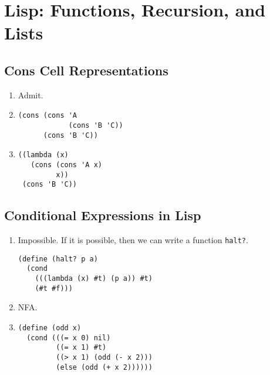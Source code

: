 \chapter{Lisp: Functions, Recursion, and Lists}


\section{Cons Cell Representations}
\begin{enumerate}
  \item
    Admit.

  \item
    \begin{verbatim}
(cons (cons 'A
            (cons 'B 'C))
      (cons 'B 'C))
    \end{verbatim}

  \item
    \begin{verbatim}
((lambda (x)
   (cons (cons 'A x)
         x))
 (cons 'B 'C))
    \end{verbatim}
\end{enumerate}


\section{Conditional Expressions in Lisp}
\begin{enumerate}
  \item
    Impossible. If it is possible, then we can write a function \texttt{halt?}.
    \begin{verbatim}
(define (halt? p a)
  (cond
    (((lambda (x) #t) (p a)) #t)
    (#t #f)))
    \end{verbatim}

  \item
    NFA.

  \item
    \begin{verbatim}
(define (odd x)
  (cond (((= x 0) nil)
         ((= x 1) #t)
         ((> x 1) (odd (- x 2)))
         (else (odd (+ x 2))))))
    \end{verbatim}
\end{enumerate}
